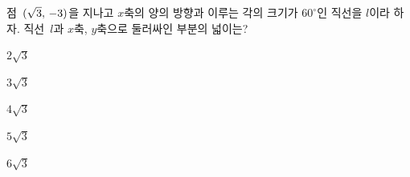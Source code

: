 점~$(\sqrt{3},\mkern3mu -3)$을 지나고 $x$축의 양의 방향과 이루는 각의 크기가 $60^\circ$인 직선을 $l$이라 하자. 직선~$l$과 $x$축, $y$축으로 둘러싸인 부분의 넓이는?
\begin{choices32}{\rule[-3ex]{0pt}{8ex}$2\sqrt{3}$}{\rule[-3ex]{0pt}{8ex}$3\sqrt{3}$}{\rule[-3ex]{0pt}{8ex}$4\sqrt{3}$}{\rule[-3ex]{0pt}{8ex}$5\sqrt{3}$}{\rule[-3ex]{0pt}{8ex}$6\sqrt{3}$}\end{choices32}
